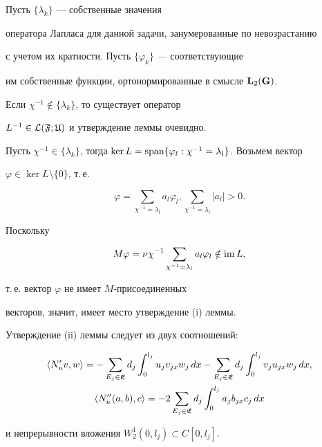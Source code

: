 \begin{pf}


Пусть $\{\lambda_k\}$ --- собственные значения 


оператора Лапласа для данной задачи, занумерованные по невозрастанию 


с учетом их кратности. Пусть $\{\varphi_k\}$ --- соответствующие  


им собственные функции, ортонормированные в смысле $\bold L_2({\bold G})$.


Если  $\chi^{-1}\notin \{\lambda_k\}$, то существует оператор


$L^{-1} \in \cal{L}(\frak{F};\frak{U})$ и утверждение леммы очевидно.





Пусть $\chi^{-1} \in\{\lambda_k\}$, тогда $\ker L=


\Span\{\varphi_l: \chi^{-1}=\lambda_l\}$. Возьмем вектор


$\varphi \in \ker L \setminus \{0\}$, т.\,е.


$$


\varphi=\sum_{\chi^{-1}=\lambda_l} a_l \varphi_l,


\sum_{\chi^{-1}=\lambda_l} |a_l|>0.


$$


Поскольку


$$


M\varphi = \nu


\chi^{-1} \sum_{\chi^{-1}=\lambda_l} a_l \varphi_l \notin \im L,


$$


т.\,е. вектор $\varphi$ не имеет $M$-присоединенных


векторов, значит, имеет место утверждение (i) леммы.


Утверждение (ii) леммы следует из двух соотношений:


\begin{gather*}


\langle N'_u v,w \rangle=-\sum_{E_j \in \frak{E}}d_j


\int_0^{l_j} u_j v_{jx} w_j \,dx- \sum_{E_j \in


\frak{E}}d_j \int_0^{l_j} v_j u_{jx} w_j \,dx,\\


%


\langle N''_u (a,b),c \rangle=-2\sum_{E_j \in


\frak{E}}d_j \int_0^{l_j} a_j b_{jx} c_j \,dx


\end{gather*}


и непрерывности вложения $W^1_2(0,l_j) \subset C[0,l_j]$.


\end{pf}





